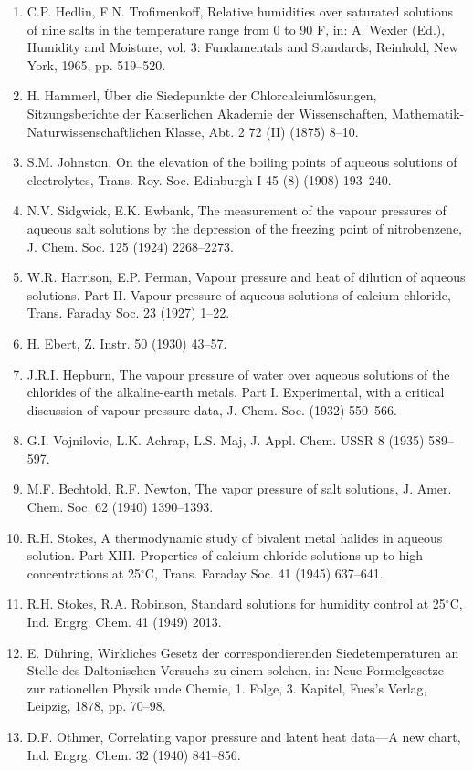 \documentclass[11pt]{article}
\begin{document}
\begin{enumerate}
\item C.P. Hedlin, F.N. Trofimenkoff, Relative humidities over saturated solutions of nine salts in the temperature range from 0 to 90 F, in: A. Wexler (Ed.), Humidity and Moisture, vol. 3: Fundamentals and Standards, Reinhold, New York, 1965, pp. 519--520.
\item H. Hammerl, \"Uber die Siedepunkte der Chlorcalciuml\"osungen, Sitzungsberichte der Kaiserlichen Akademie der Wissenschaften, Mathematik-Naturwissenschaftlichen Klasse, Abt. 2 72 (II) (1875) 8--10.
\item S.M. Johnston, On the elevation of the boiling points of aqueous solutions of electrolytes, Trans. Roy. Soc. Edinburgh I 45 (8) (1908) 193--240.
\item N.V. Sidgwick, E.K. Ewbank, The measurement of the vapour pressures of aqueous salt solutions by the depression of the freezing point of nitrobenzene, J. Chem. Soc. 125 (1924) 2268--2273.
\item W.R. Harrison, E.P. Perman, Vapour pressure and heat of dilution of aqueous solutions. Part II. Vapour pressure of aqueous solutions of calcium chloride, Trans. Faraday Soc. 23 (1927) 1--22.
\item H. Ebert, Z. Instr. 50 (1930) 43--57.
\item J.R.I. Hepburn, The vapour pressure of water over aqueous solutions of the chlorides of the alkaline-earth metals. Part I. Experimental, with a critical discussion of vapour-pressure data, J. Chem. Soc. (1932) 550--566.
\item G.I. Vojnilovic, L.K. Achrap, L.S. Maj, J. Appl. Chem. USSR 8 (1935) 589--597.
\item M.F. Bechtold, R.F. Newton, The vapor pressure of salt solutions, J. Amer. Chem. Soc. 62 (1940) 1390--1393.
\item R.H. Stokes, A thermodynamic study of bivalent metal halides in aqueous solution. Part XIII. Properties of calcium chloride solutions up to high concentrations at 25$^\circ$C, Trans. Faraday Soc. 41 (1945) 637--641.
\item R.H. Stokes, R.A. Robinson, Standard solutions for humidity control at 25$^\circ$C, Ind. Engrg. Chem. 41 (1949) 2013.
\item E. D\"uhring, Wirkliches Gesetz der correspondierenden Siedetemperaturen an Stelle des Daltonischen Versuchs zu einem solchen, in: Neue Formelgesetze zur rationellen Physik unde Chemie, 1. Folge, 3. Kapitel, Fues's Verlag, Leipzig, 1878, pp. 70--98.
\item D.F. Othmer, Correlating vapor pressure and latent heat data---A new chart, Ind. Engrg. Chem. 32 (1940) 841--856.

\end{enumerate}
\end{document}
